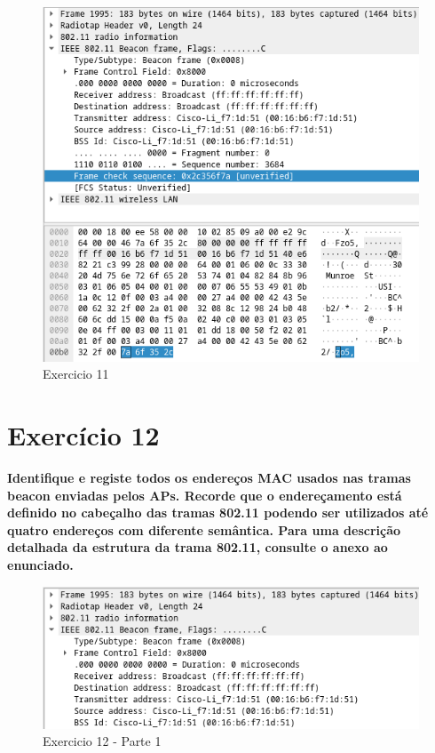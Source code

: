 \documentclass[a4paper]{report}
\begin{document}
\begin{figure}[H]
    \centering 
    \includegraphics[width=\textwidth]{images/ex11.png}  
    \caption{Exercicio 11}
    \label{fig:ex11}
\end{figure}

\section{Exercício 12}
\textbf{Identifique e registe todos os endereços MAC usados nas tramas beacon
    enviadas pelos APs. Recorde que o endereçamento está definido no cabeçalho
    das tramas 802.11 podendo ser utilizados até quatro endereços com diferente
    semântica. Para uma descrição detalhada da estrutura da trama 802.11,
    consulte o anexo ao enunciado.}
\begin{figure}[H]
    \centering 
    \includegraphics[width=\textwidth]{images/ex12p1.png}  
    \caption{Exercicio 12 - Parte 1}
    \label{fig:ex12p1}
\end{figure}
\end{document}
